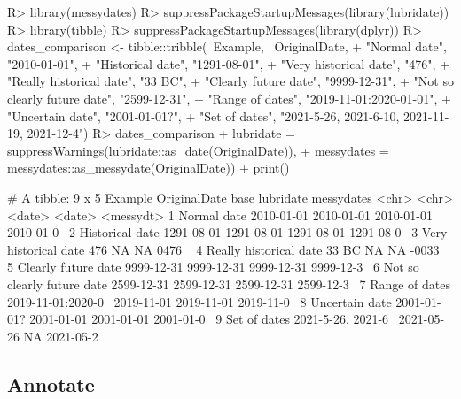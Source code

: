 \documentclass[
]{jss}
\begin{document}
\begin{CodeChunk}
\begin{CodeInput}
R> library(messydates)
R> suppressPackageStartupMessages(library(lubridate))
R> library(tibble)
R> suppressPackageStartupMessages(library(dplyr))
R> dates_comparison <- tibble::tribble(~Example, ~OriginalDate,
+                                     "Normal date", "2010-01-01",
+                                     "Historical date", "1291-08-01",
+                                     "Very historical date", "476",
+                                     "Really historical date", "33 BC",
+                                     "Clearly future date", "9999-12-31",
+                                     "Not so clearly future date", "2599-12-31",
+                                     "Range of dates", "2019-11-01:2020-01-01",
+                                     "Uncertain date", "2001-01-01?",
+                                     "Set of dates", "2021-5-26, 2021-6-10, 2021-11-19, 2021-12-4")
R> dates_comparison %
+                                    lubridate = suppressWarnings(lubridate::as_date(OriginalDate)),
+                                    messydates = messydates::as_messydate(OriginalDate)) %
+   print()
\end{CodeInput}
\begin{CodeOutput}
# A tibble: 9 x 5
  Example                    OriginalDate       base       lubridate  messydates
  <chr>                      <chr>              <date>     <date>     <messydt> 
1 Normal date                2010-01-01         2010-01-01 2010-01-01 2010-01-0~
2 Historical date            1291-08-01         1291-08-01 1291-08-01 1291-08-0~
3 Very historical date       476                NA         NA         0476     ~
4 Really historical date     33 BC              NA         NA         -0033    ~
5 Clearly future date        9999-12-31         9999-12-31 9999-12-31 9999-12-3~
6 Not so clearly future date 2599-12-31         2599-12-31 2599-12-31 2599-12-3~
7 Range of dates             2019-11-01:2020-0~ 2019-11-01 2019-11-01 2019-11-0~
8 Uncertain date             2001-01-01?        2001-01-01 2001-01-01 2001-01-0~
9 Set of dates               2021-5-26, 2021-6~ 2021-05-26 NA         2021-05-2~
\end{CodeOutput}
\end{CodeChunk}

\hypertarget{annotate}{%
\subsection{Annotate}\label{annotate}}
\end{document}
